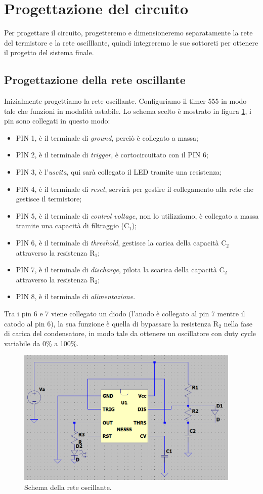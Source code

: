 \documentclass{report}
\begin{document}
\newpage
\section{Progettazione del circuito}
Per progettare il circuito, progetteremo e dimensioneremo separatamente la rete del termistore e la rete oscilllante, quindi integreremo le sue sottoreti per ottenere il progetto del sistema finale.
\subsection{Progettazione della rete oscillante}
Inizialmente progettiamo la rete oscillante. Configuriamo il timer 555 in modo tale che funzioni in modalità astabile. Lo schema scelto è mostrato in figura \ref{figura:schema555}, i pin sono collegati in questo modo:
\begin{itemize}
\item PIN 1, è il terminale di \textit{ground}, perciò è collegato a massa;
\item PIN 2, è il terminale di \textit{trigger}, è cortocircuitato con il PIN 6;
\item PIN 3, è l'\textit{uscita}, qui sarà collegato il LED tramite una resistenza;
\item PIN 4, è il terminale di \textit{reset}, servirà per gestire il collegamento alla rete che gestisce il termistore;
\item PIN 5, è il terminale di \textit{control voltage}, non lo utilizziamo, è collegato a massa tramite una capacità di filtraggio ($\mathrm{C_1}$);
\item PIN 6, è il terminale di \textit{threshold}, gestisce la carica della capacità $\mathrm{C_2}$ attraverso la resistenza $\mathrm{R_1}$;
\item PIN 7, è il terminale di \textit{discharge}, pilota la scarica della capacità $\mathrm{C_2}$ attraverso la resistenza $\mathrm{R_2}$;
\item PIN 8, è il terminale di \textit{alimentazione}. 
\end{itemize} 
Tra i pin 6 e 7 viene collegato un diodo (l'anodo è collegato al pin 7 mentre il catodo al pin 6), la sua funzione è quella di bypassare la resistenza $\mathrm{R_2}$ nella fase di carica del condensatore, in modo tale da ottenere un oscillatore con duty cycle variabile da 0\% a 100\%. 
\begin{figure}[h!]
	\centering
	\includegraphics[height=6.5cm]{immagini/schema555}
	\caption{Schema della rete oscillante.} 
	\label{figura:schema555}
\end{figure}
\end{document}
